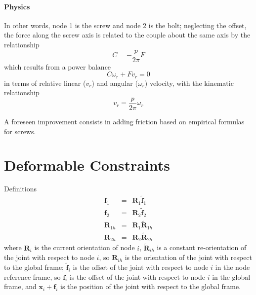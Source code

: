 \documentclass[10pt,dvips,fleqn]{report}
\newcommand{\T}[1]{\boldsymbol{#1}}
\begin{document}
\paragraph{Physics}
In other words, node 1 is the screw and node 2 is the bolt;
neglecting the offset, the force along the screw axis is related
to the couple about the same axis by the relationship
\begin{equation}
	C = - \frac{p}{2\pi} F
\end{equation}
which results from a power balance
\begin{equation}
	C \omega_r + F v_r = 0
\end{equation}
in terms of relative linear ($v_r$) and angular ($\omega_r$) velocity,
with the kinematic relationship
\begin{equation} 
	v_r = \frac{p}{2\pi} \omega_r
\end{equation}

A foreseen improvement consists in adding friction based on empirical
formulas for screws.







\section{Deformable Constraints}
Definitions
\begin{eqnarray*}
	\T{f}_1 & = & \T{R}_1 \tilde{\T{f}}_1 \\
	\T{f}_2 & = & \T{R}_2 \tilde{\T{f}}_2 \\
	\T{R}_{1h} & = & \T{R}_1 \tilde{\T{R}}_{1h} \\
	\T{R}_{2h} & = & \T{R}_2 \tilde{\T{R}}_{2h}
\end{eqnarray*}
where $\T{R}_i$ is the current orientation of node $i$, 
$\tilde{\T{R}}_{ih}$ is a constant re-orientation of the joint
with respect to node $i$, so $\T{R}_{ih}$ is the orientation
of the joint with respect to the global frame;
$\tilde{\T{f}}_i$ is the offset of the joint with respect to
node $i$ in the node reference frame, so $\T{f}_i$ is the offset 
of the joint with respect to node $i$ in the global frame, and
$\T{x}_i+\T{f}_i$ is the position of the joint with respect 
to the global frame.
\end{document}

